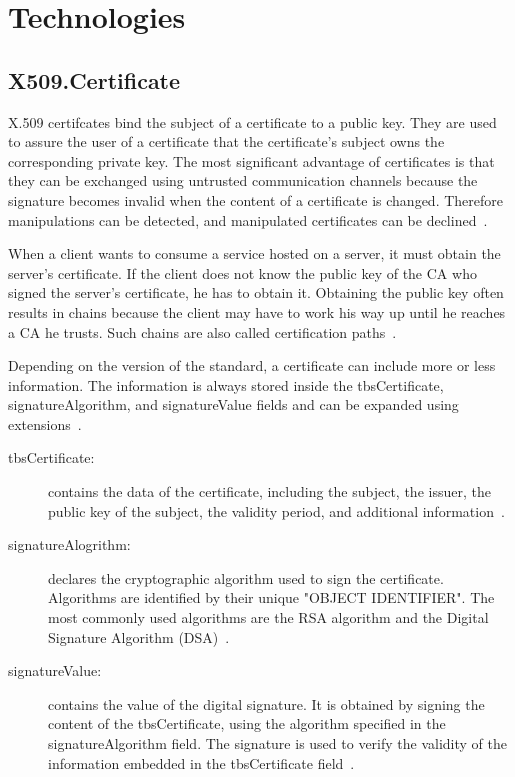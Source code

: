 
\section{Technologies}
\subsection{X509.Certificate}
X.509 certifcates bind the subject of a certificate to a public key.
They are used to assure the user of a certificate that the certificate's subject owns the corresponding private key.
The most significant advantage of certificates is that they can be exchanged using untrusted communication channels because the signature becomes invalid when the content of a certificate is changed.
Therefore manipulations can be detected, and manipulated certificates can be declined~\cite{x509rfc}.

When a client wants to consume a service hosted on a server, it must obtain the server's certificate.
If the client does not know the public key of the CA who signed the server's certificate, he has to obtain it.
Obtaining the public key often results in chains because the client may have to work his way up until he reaches a CA he trusts.
Such chains are also called certification paths~\cite{x509rfc}.

Depending on the version of the standard, a certificate can include more or less information.
The information is always stored inside the tbsCertificate, signatureAlgorithm, and signatureValue fields and can be expanded using extensions~\cite{x509rfc}.
\begin{description}
	\item[tbsCertificate:] contains the data of the certificate, including the subject, the issuer, the public key of the subject, the validity period, and additional information~\cite{x509rfc}.
	\item[signatureAlogrithm:] declares the cryptographic algorithm used to sign the certificate.
		Algorithms are identified by their unique "OBJECT IDENTIFIER".
		The most commonly used algorithms are the RSA algorithm and the Digital Signature Algorithm (DSA)~\cite{x509rfc}.
	\item[signatureValue:] contains the value of the digital signature.
		It is obtained by signing the content of the tbsCertificate, using the algorithm specified in the signatureAlgorithm field.
		The signature is used to verify the validity of the information embedded in the tbsCertificate field~\cite{x509rfc}.
\end{description}

